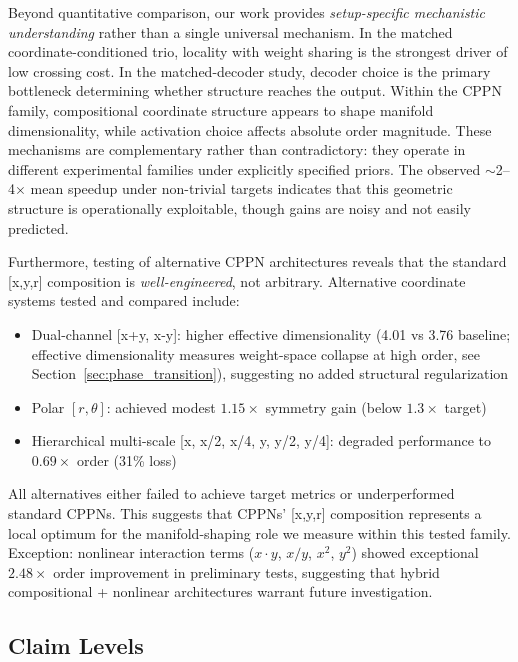 \documentclass{article}
\begin{document}
Beyond quantitative comparison, our work provides \emph{setup-specific mechanistic understanding} rather than a single universal mechanism. In the matched coordinate-conditioned trio, locality with weight sharing is the strongest driver of low crossing cost. In the matched-decoder study, decoder choice is the primary bottleneck determining whether structure reaches the output. Within the CPPN family, compositional coordinate structure appears to shape manifold dimensionality, while activation choice affects absolute order magnitude. These mechanisms are complementary rather than contradictory: they operate in different experimental families under explicitly specified priors. The observed $\sim$2--4$\times$ mean speedup under non-trivial targets indicates that this geometric structure is operationally exploitable, though gains are noisy and not easily predicted.

Furthermore, testing of alternative CPPN architectures reveals that the standard [x,y,r] composition is \emph{well-engineered}, not arbitrary. Alternative coordinate systems tested and compared include:
\begin{itemize}
    \item Dual-channel [x+y, x-y]: higher effective dimensionality (4.01 vs 3.76 baseline; effective dimensionality measures weight-space collapse at high order, see Section~\ref{sec:phase_transition}), suggesting no added structural regularization
    \item Polar $[r,\theta]$: achieved modest $1.15\times$ symmetry gain (below $1.3\times$ target)
    \item Hierarchical multi-scale [x, x/2, x/4, y, y/2, y/4]: degraded performance to $0.69\times$ order (31\% loss)
\end{itemize}
All alternatives either failed to achieve target metrics or underperformed standard CPPNs. This suggests that CPPNs' [x,y,r] composition represents a local optimum for the manifold-shaping role we measure within this tested family. Exception: nonlinear interaction terms ($x \cdot y$, $x/y$, $x^2$, $y^2$) showed exceptional $2.48\times$ order improvement in preliminary tests, suggesting that hybrid compositional + nonlinear architectures warrant future investigation.

\subsection{Claim Levels}
\end{document}
